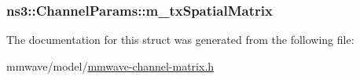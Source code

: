 \subsubsection[{\texorpdfstring{m\+\_\+tx\+Spatial\+Matrix}{m_txSpatialMatrix}}]{ ns3\+::\+Channel\+Params\+::m\+\_\+tx\+Spatial\+Matrix}\hypertarget{structns3_1_1ChannelParams_aa83a7d27a497c2ce0abcb43829715918}{}\label{structns3_1_1ChannelParams_aa83a7d27a497c2ce0abcb43829715918}


The documentation for this struct was generated from the following file\+:\begin{DoxyCompactItemize}
\item 
mmwave/model/\hyperlink{mmwave-channel-matrix_8h}{mmwave-\/channel-\/matrix.\+h}\end{DoxyCompactItemize}
